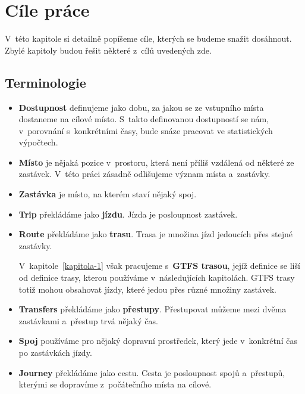 \chapter{Cíle práce}

V~této kapitole si detailně popíšeme cíle, kterých se budeme snažit dosáhnout. Zbylé kapitoly budou řešit některé z~cílů uvedených zde.

\section{Terminologie}\label{data-terminologie}

\begin{itemize}
    \item \textbf{Dostupnost} definujeme jako dobu, za jakou se ze vstupního místa dostaneme na cílové místo. S~takto definovanou dostupností se nám, v~porovnání s~konkrétními časy, bude snáze pracovat ve statistických výpočtech.\label{definice-dostupnosti}
    
    \item \textbf{Místo} je nějaká pozice v~prostoru, která není příliš vzdálená od některé ze zastávek. V~této práci zásadně odlišujeme význam místa a~zastávky.

    \item \textbf{Zastávka} je místo, na kterém staví nějaký spoj.

    \item \textbf{Trip} překládáme jako \textbf{jízdu}. Jízda je posloupnost zastávek.
    
    \item \textbf{Route} překládáme jako \textbf{trasu}. Trasa je množina jízd jedoucích přes stejné zastávky.
    
    V~kapitole~\ref{kapitola-1} však pracujeme s~\textbf{GTFS trasou}, jejíž definice se liší od definice trasy, kterou používáme v~následujících kapitolách. GTFS trasy totiž mohou obsahovat jízdy, které jedou přes různé množiny zastávek.
    
    \item \textbf{Transfers} překládáme jako \textbf{přestupy}. Přestupovat můžeme mezi dvěma zastávkami a~přestup trvá nějaký čas.
    
    \item \textbf{Spoj} používáme pro nějaký dopravní prostředek, který jede v~konkrétní čas po zastávkách jízdy. %
    
    \item \textbf{Journey} překládáme jako cestu. Cesta je posloupnost spojů a~přestupů, kterými se dopravíme z~počátečního místa na cílové.

\end{itemize}



